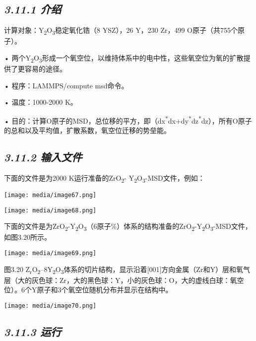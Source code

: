 \documentclass[
]{article}
\begin{document}
\hypertarget{ux4ecbux7ecd-2}{%
\subsection{\texorpdfstring{\emph{3.11.1
介绍}}{3.11.1 介绍}}\label{ux4ecbux7ecd-2}}

计算对象：Y\textsubscript{2}O\textsubscript{3}稳定氧化锆（8 YSZ），26
Y，230 Zr，499 O原子（共755个原子）。

•
两个Y\textsubscript{2}O\textsubscript{3}形成一个氧空位，以维持体系中的电中性，这些氧空位为氧的扩散提供了更容易的途径。

• 程序：LAMMPS/compute msd命令。

• 温度：1000-2000 K。

•
目的：计算O原子的MSD，总位移的平方，即（dx\textsuperscript{*}dx+dy\textsuperscript{*}dz\textsuperscript{*}dz），所有O原子的总和以及平均值，扩散系数，氧空位迁移的势垒能。

\hypertarget{ux8f93ux5165ux6587ux4ef6-9}{%
\subsection{\texorpdfstring{\emph{3.11.2
输入文件}}{3.11.2 输入文件}}\label{ux8f93ux5165ux6587ux4ef6-9}}

下面的文件是为2000 K运行准备的ZrO\textsubscript{2}-
Y\textsubscript{2}O\textsubscript{3}-MSD文件，例如：

\texttt{[image: media/image67.png]}

\texttt{[image: media/image68.png]}

下面的文件是为ZrO\textsubscript{2}-Y\textsubscript{2}O\textsubscript{3}（6原子\%）体系的结构准备的ZrO\textsubscript{2}-Y\textsubscript{2}O\textsubscript{3}-MSD文件，如图3.20所示。

\texttt{[image: media/image69.png]}

图3.20
Z\textsubscript{r}O\textsubscript{2}--8Y\textsubscript{2}O\textsubscript{3}体系的切片结构，显示沿着{[}001{]}方向金属（Zr和Y）层和氧气层（大的灰色球：Zr，大的黑色球：Y，小的灰色球：O，大的虚线白球：氧空位）。6个Y原子和3个氧空位随机分布并显示在结构中。

\texttt{[image: media/image70.png]}

\hypertarget{ux8fd0ux884c-2}{%
\subsection{\texorpdfstring{\emph{3.11.3
运行}}{3.11.3 运行}}\label{ux8fd0ux884c-2}}
\end{document}
